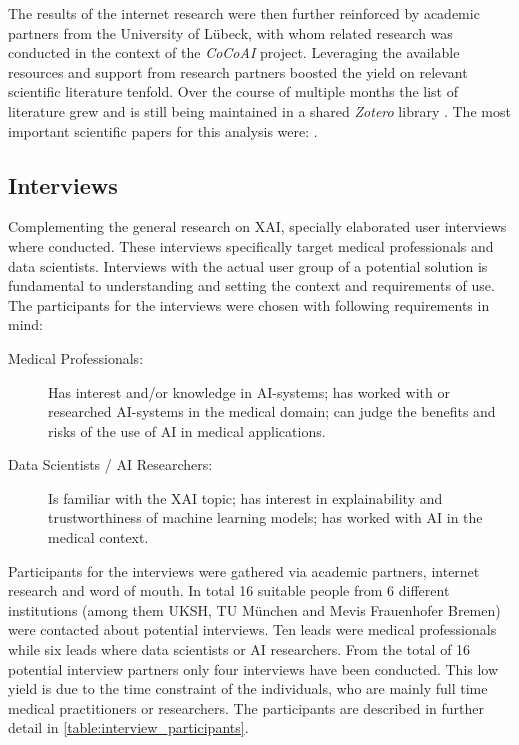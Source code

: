 \documentclass[11pt,a4paper,english]{scrreprt}
\begin{document}
The results of the internet research were then further reinforced by academic partners from the University of Lübeck, with whom related research was conducted in the context of the \textit{CoCoAI} project. Leveraging the available resources and support from research partners boosted the yield on relevant scientific literature tenfold. Over the course of multiple months the list of literature grew and is still being maintained in a shared \textit{Zotero} library \parencite{zotero_website}. The most important scientific papers for this analysis were: \textcite{ras_explanation_2018, arrieta_explainable_2019, ribeiro_why_2016, adadi_blackbox_2018,knapic_explainable_2021, samek_explaining_2021, chiou_trusting_2021, hoffman_metrics_2019}. 

\subsection{Interviews}
Complementing the general research on XAI, specially elaborated user interviews where conducted. These interviews specifically target medical professionals and data scientists. Interviews with the actual user group of a potential solution is fundamental to understanding and setting the context and requirements of use. The participants for the interviews were chosen with following requirements in mind:
\begin{description}
    \item[Medical Professionals:] Has interest and/or knowledge in AI-systems; has worked with or researched AI-systems in the medical domain; can judge the benefits and risks of the use of AI in medical applications.
    \item[Data Scientists / AI Researchers:] Is familiar with the XAI topic; has interest in explainability and trustworthiness of machine learning models; has worked with AI in the medical context.
\end{description}
Participants for the interviews were gathered via academic partners, internet research and word of mouth. In total 16 suitable people from 6 different institutions (among them UKSH, TU München and Mevis Frauenhofer Bremen) were contacted about potential interviews. Ten leads were medical professionals while six leads where data scientists or AI researchers. From the total of 16 potential interview partners only four interviews have been conducted. This low yield is due to the time constraint of the individuals, who are mainly full time medical practitioners or researchers. The participants are described in further detail in \autoref{table:interview_participants}.
\end{document}

